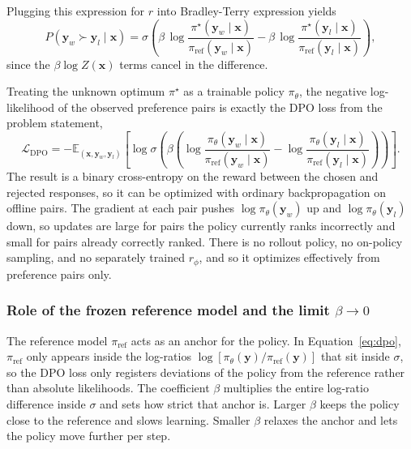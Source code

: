 \documentclass{article}
\begin{document}
Plugging this expression for
$r$ into Bradley-Terry expression yields
\begin{equation*}
  P(\mathbf{y}_w \succ \mathbf{y}_l \mid \mathbf{x}) =
    \sigma\!\left(
      \beta\,\log\!\frac{\pi^\star(\mathbf{y}_w\mid\mathbf{x})}{\pi_\text{ref}(\mathbf{y}_w\mid\mathbf{x})}
      - \beta\,\log\!\frac{\pi^\star(\mathbf{y}_l\mid\mathbf{x})}{\pi_\text{ref}(\mathbf{y}_l\mid\mathbf{x})}
    \right),
\end{equation*}
since the $\beta\log Z(\mathbf{x})$ terms cancel in the difference.

Treating the unknown optimum
$\pi^\star$ as a trainable policy $\pi_\theta$, the negative log-likelihood
of the observed preference pairs is exactly the DPO loss from the problem
statement,
\begin{equation}
  \mathcal{L}_\text{DPO} =
    -\mathbb{E}_{(\mathbf{x},\mathbf{y}_w,\mathbf{y}_l)}\!\left[
      \log \sigma\!\left(
        \beta\!\left(
          \log\!\frac{\pi_\theta(\mathbf{y}_w\mid\mathbf{x})}{\pi_\text{ref}(\mathbf{y}_w\mid\mathbf{x})}
          - \log\!\frac{\pi_\theta(\mathbf{y}_l\mid\mathbf{x})}{\pi_\text{ref}(\mathbf{y}_l\mid\mathbf{x})}
        \right)
      \right)
    \right].
  \label{eq:dpo}
\end{equation}
The result is a binary cross-entropy on the reward between the chosen and rejected responses, so it can be optimized
with ordinary backpropagation on offline pairs. The gradient at each pair pushes
$\log\pi_\theta(\mathbf{y}_w)$ up and $\log\pi_\theta(\mathbf{y}_l)$ down, so updates are large for pairs
the policy currently ranks incorrectly and small for pairs already correctly
ranked. There is no rollout policy, no on-policy sampling, and no separately
trained $r_\phi$, and so it optimizes effectively from preference pairs only.

\subsubsection*{Role of the frozen reference model and the limit $\beta \to 0$}

The reference model $\pi_\text{ref}$ acts as an anchor for the policy.
In Equation~\ref{eq:dpo}, $\pi_\text{ref}$ only appears inside the
log-ratios $\log[\pi_\theta(\mathbf{y})/\pi_\text{ref}(\mathbf{y})]$ that
sit inside $\sigma$, so the DPO loss only registers deviations of
the policy from the reference rather than absolute likelihoods. The
coefficient $\beta$ multiplies the entire log-ratio difference inside
$\sigma$ and sets how strict that anchor is. Larger $\beta$ keeps the
policy close to the reference and slows learning. Smaller $\beta$ relaxes
the anchor and lets the policy move further per step.
\end{document}
